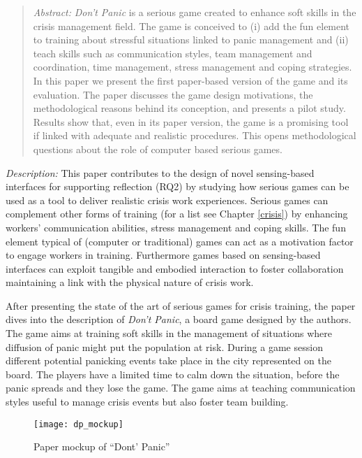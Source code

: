 \begin{quote}
	\emph{Abstract:} \emph{Don't Panic} is a serious game created to enhance soft skills in the crisis management field. The game is conceived to (i) add the fun element to training about stressful situations linked to panic management and (ii) teach skills such as communication styles, team management and coordination, time management, stress management and coping strategies. In this paper we present the first paper-based version of the game and its evaluation. The paper discusses the game design motivations, the methodological reasons behind its conception, and presents a pilot study. Results show that, even in its paper version, the game is a promising tool if linked with adequate and realistic procedures. This opens methodological questions about the role of computer based serious games. 
\end{quote}

\emph{Description:} This paper contributes to the design of novel sensing-based interfaces for supporting reflection (RQ2) by studying how serious games can be used as a tool to deliver realistic crisis work experiences. Serious games can complement other forms of training (for a list see Chapter \ref{crisis}) by enhancing workers' communication abilities, stress management and coping skills. The fun element typical of (computer or traditional) games can act as a motivation factor to engage workers in training. Furthermore games based on sensing-based interfaces can exploit tangible and embodied interaction to foster collaboration maintaining a link with the physical nature of crisis work.

After presenting the state of the art of serious games for crisis training, the paper dives into the description of \emph{Don't Panic}, a board game designed by the authors. The game aims at training soft skills in the management of situations where diffusion of panic might put the population at risk. During a game session different potential panicking events take place in the city represented on the board. The players have a limited time to calm down the situation, before the panic spreads and they lose the game. The game aims at teaching communication styles useful to manage crisis events but also foster team building. 

\begin{figure}
	[tbh] \centering 
	\texttt{[image: dp\_mockup]} \caption{Paper mockup of “Dont’ Panic”} \label{fig:dp-mockup} 
\end{figure}

